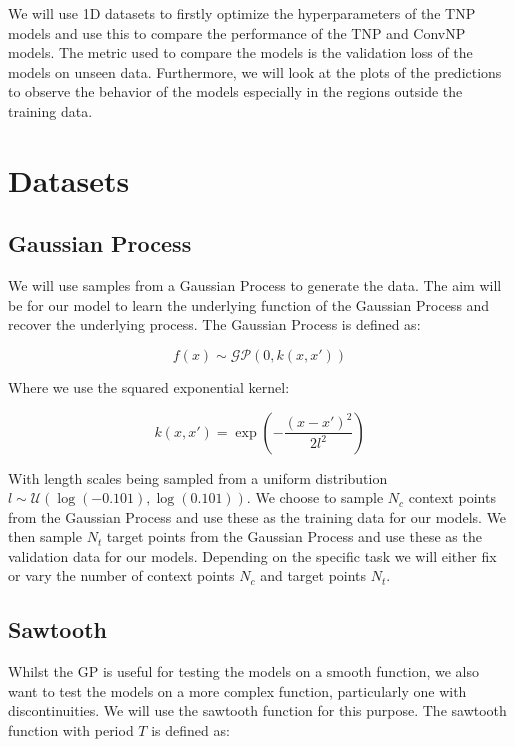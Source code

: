 \documentclass[../../main.tex]{subfiles}
\begin{document}
We will use 1D datasets to firstly optimize the hyperparameters of the TNP models and use this to compare the performance of the TNP and ConvNP models. The metric used to compare the models is the validation loss of the models on unseen data. Furthermore, we will look at the plots of the predictions to observe the behavior of the models especially in the regions outside the training data.


\section{Datasets}

\subsection{Gaussian Process}
\label{sec:1d-gp-dataset}

We will use samples from a Gaussian Process to generate the data. The aim will be for our model to learn the underlying function of the Gaussian Process and recover the underlying process. The Gaussian Process is defined as:

\begin{equation}
	f(x) \sim \mathcal{GP}(0, k(x, x'))
\end{equation}

Where we use the squared exponential kernel:

\begin{equation}
	k(x, x') = \exp\left(-\frac{(x - x')^2}{2l^2}\right)
\end{equation}

With length scales being sampled from a uniform distribution $l \sim \mathcal{U}(\log(-0.101), \log(0.101))$. We choose to sample $N_c$ context points from the Gaussian Process and use these as the training data for our models. We then sample $N_t$ target points from the Gaussian Process and use these as the validation data for our models. Depending on the specific task we will either fix or vary the number of context points $N_c$ and target points $N_t$.


\subsection{Sawtooth}
\label{sec:1d-sawtooth-dataset}

Whilst the GP is useful for testing the models on a smooth function, we also want to test the models on a more complex function, particularly one with discontinuities. We will use the sawtooth function for this purpose. The sawtooth function with period $T$ is defined as:
\end{document}

